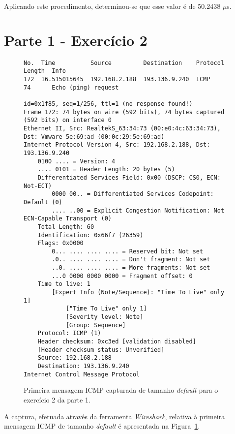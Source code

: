 Aplicando este procedimento, determinou-se que esse valor é de 50.2438 \(\mu\)s.


\section*{Parte 1 - Exercício 2}

\begin{figure}[ht]
  \centering
\begin{Verbatim}[fontsize=\scriptsize]
No.  Time          Source         Destination    Protocol  Length  Info
172  16.515015645  192.168.2.188  193.136.9.240  ICMP      74      Echo (ping) request

id=0x1f85, seq=1/256, ttl=1 (no response found!)
Frame 172: 74 bytes on wire (592 bits), 74 bytes captured (592 bits) on interface 0
Ethernet II, Src: RealtekS_63:34:73 (00:e0:4c:63:34:73), Dst: Vmware_5e:69:ad (00:0c:29:5e:69:ad)
Internet Protocol Version 4, Src: 192.168.2.188, Dst: 193.136.9.240
    0100 .... = Version: 4
    .... 0101 = Header Length: 20 bytes (5)
    Differentiated Services Field: 0x00 (DSCP: CS0, ECN: Not-ECT)
        0000 00.. = Differentiated Services Codepoint: Default (0)
        .... ..00 = Explicit Congestion Notification: Not ECN-Capable Transport (0)
    Total Length: 60
    Identification: 0x66f7 (26359)
    Flags: 0x0000
        0... .... .... .... = Reserved bit: Not set
        .0.. .... .... .... = Don't fragment: Not set
        ..0. .... .... .... = More fragments: Not set
        ...0 0000 0000 0000 = Fragment offset: 0
    Time to live: 1
        [Expert Info (Note/Sequence): "Time To Live" only 1]
            ["Time To Live" only 1]
            [Severity level: Note]
            [Group: Sequence]
    Protocol: ICMP (1)
    Header checksum: 0xc3ed [validation disabled]
    [Header checksum status: Unverified]
    Source: 192.168.2.188
    Destination: 193.136.9.240
Internet Control Message Protocol
\end{Verbatim}
  \caption{Primeira mensagem ICMP capturada de tamanho \emph{default} para o
  exercício 2 da parte 1.}
  \label{fig:parte1-ex2-pacote}
\end{figure}

A captura, efetuada através da ferramenta \emph{Wireshark}, relativa à primeira
mensagem ICMP de tamanho \emph{default} é apresentada na
Figura~\ref{fig:parte1-ex2-pacote}.


